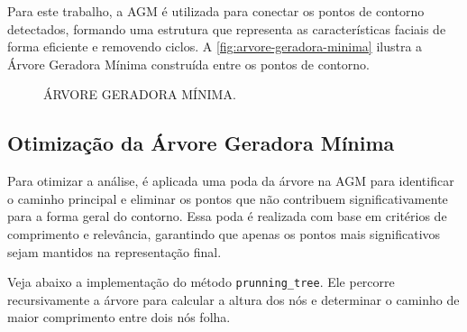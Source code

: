 Para este trabalho, a AGM é utilizada para conectar os pontos de contorno detectados, formando uma estrutura que representa as características faciais de forma eficiente e removendo ciclos. A \autoref{fig:arvore-geradora-minima} ilustra a Árvore Geradora Mínima construída entre os pontos de contorno.

\begin{figure}
    \caption{ÁRVORE GERADORA MÍNIMA.}
    \label{fig:arvore-geradora-minima}
    \centering
\end{figure}

\subsection{Otimização da Árvore Geradora Mínima}

Para otimizar a análise, é aplicada uma poda da árvore na AGM para identificar o caminho principal e eliminar os pontos que não contribuem significativamente para a forma geral do contorno. Essa poda é realizada com base em critérios de comprimento e relevância, garantindo que apenas os pontos mais significativos sejam mantidos na representação final.


Veja abaixo a implementação do método \texttt{prunning\_tree}. Ele percorre recursivamente a árvore para calcular a altura dos nós e determinar o caminho de maior comprimento entre dois nós folha.

